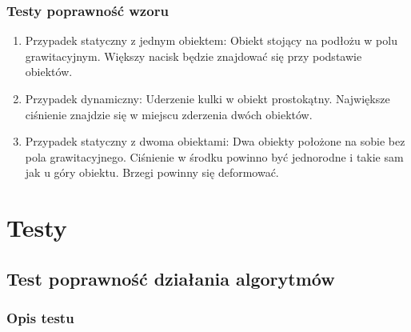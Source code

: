 \documentclass[12pt, letterpaper]{report}
\begin{document}
    \subsection{Testy poprawność wzoru}
    \begin{enumerate}
        \item Przypadek statyczny z jednym obiektem: Obiekt stojący na podłożu w polu grawitacyjnym.
        Większy nacisk będzie znajdować się przy podstawie obiektów.
        
        \item Przypadek dynamiczny: Uderzenie kulki w obiekt prostokątny. Największe ciśnienie 
        znajdzie się w miejscu zderzenia dwóch obiektów.

        \item Przypadek statyczny z dwoma obiektami: Dwa obiekty położone na sobie bez pola grawitacyjnego.
        Ciśnienie w środku powinno być jednorodne i takie sam jak u góry obiektu. Brzegi powinny się deformować.
    \end{enumerate}

\chapter{Testy}
    \section{Test poprawność działania algorytmów}
    \subsection{Opis testu}
    
\end{document}
